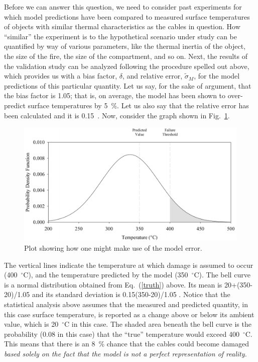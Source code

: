 Before we can answer this question, we need to consider past experiments for which model predictions have been compared to measured surface temperatures of objects
with similar thermal characteristics as the cables in question. How ``similar'' the experiment is to the hypothetical scenario under study can be quantified by way of
various parameters, like the thermal inertia of the object, the size of the fire, the size of the compartment, and so on. Next, the results of the validation study can be
analyzed following the procedure spelled out above, which provides us with a bias factor, $\delta$, and relative error, $\tilde{\sigma}_M$, for the model
predictions of this particular quantity. Let us say, for the sake of argument, that the bias factor is 1.05; that is, on average, the model has been shown to over-predict
surface temperatures by 5~\%. Let us also say that the relative error has been calculated and it is 0.15~.
Now, consider the graph shown in Fig.~\ref{bell_curve}.
\begin{figure}[ht]
\begin{center}
\includegraphics[width=5.in]{FIGURES/bell_curve}
\end{center}
\caption[Demonstration of model error.]{Plot showing how one might make use of the model error.}
\label{bell_curve}
\end{figure}
The vertical lines indicate the temperature at which damage is assumed to occur (400~$^\circ$C), and the temperature predicted by the
model (350~$^\circ$C). The bell curve is a normal distribution obtained from Eq.~(\ref{truth}) above. Its mean is 20+(350-20)/1.05 and its standard deviation
is 0.15(350-20)/1.05 . Notice that the statistical analysis
above assumes that the measured and predicted quantity, in this case surface temperature, is reported as a change above or below its ambient value, which is
20~$^\circ$C in this case. The shaded area beneath the bell curve is the probability (0.08 in this case) that the ``true'' temperature would exceed 400~$^\circ$C. 
This means that there is an 8~\% chance that the cables could
become damaged {\em based solely on the fact that the model is not a perfect representation of reality.} 

